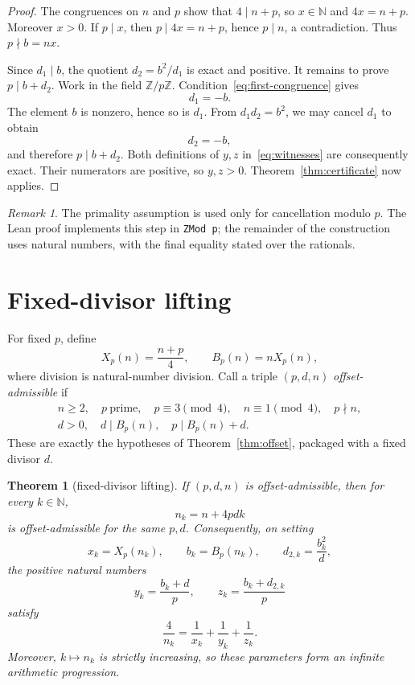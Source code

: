 \documentclass[11pt]{article}
\newtheorem{theorem}{Theorem}[section]
\theoremstyle{remark}
\newtheorem*{remark}{Remark}
\newcommand{\N}{\mathbb{N}}
\newcommand{\Z}{\mathbb{Z}}
\begin{document}
\begin{proof}
The congruences on \(n\) and \(p\) show that \(4\mid n+p\), so \(x\in\N\) and
\(4x=n+p\).  Moreover \(x>0\).  If \(p\mid x\), then
\(p\mid4x=n+p\), hence \(p\mid n\), a contradiction.  Thus \(p\nmid b=nx\).

Since \(d_1\mid b\), the quotient \(d_2=b^2/d_1\) is exact and positive.  It
remains to prove \(p\mid b+d_2\).  Work in the field \(\Z/p\Z\).
Condition~\eqref{eq:first-congruence} gives
\[
  d_1=-b.
\]
The element \(b\) is nonzero, hence so is \(d_1\).  From \(d_1d_2=b^2\), we may
cancel \(d_1\) to obtain
\[
  d_2=-b,
\]
and therefore \(p\mid b+d_2\).  Both definitions of \(y,z\)
in~\eqref{eq:witnesses} are consequently exact.  Their numerators are positive,
so \(y,z>0\).  Theorem~\ref{thm:certificate} now applies.
\end{proof}

\begin{remark}
The primality assumption is used only for cancellation modulo \(p\).  The Lean
proof implements this step in \texttt{ZMod p}; the remainder of the construction
uses natural numbers, with the final equality stated over the rationals.
\end{remark}

\section{Fixed-divisor lifting}

For fixed \(p\), define
\[
  X_p(n)=\frac{n+p}{4},
  \qquad
  B_p(n)=nX_p(n),
\]
where division is natural-number division.  Call a triple \((p,d,n)\)
\emph{offset-admissible} if
\[
\begin{gathered}
  n\ge2,\quad p\ \text{prime},\quad
  p\equiv3\pmod4,\quad n\equiv1\pmod4,\quad p\nmid n,\\
  d>0,\quad d\mid B_p(n),\quad p\mid B_p(n)+d.
\end{gathered}
\]
These are exactly the hypotheses of Theorem~\ref{thm:offset}, packaged with a
fixed divisor \(d\).

\begin{theorem}[fixed-divisor lifting]\label{thm:lifting}
If \((p,d,n)\) is offset-admissible, then for every \(k\in\N\),
\[
  n_k=n+4pdk
\]
is offset-admissible for the same \(p,d\).  Consequently, on setting
\[
  x_k=X_p(n_k),\qquad b_k=B_p(n_k),\qquad
  d_{2,k}=\frac{b_k^2}{d},
\]
the positive natural numbers
\[
  y_k=\frac{b_k+d}{p},
  \qquad
  z_k=\frac{b_k+d_{2,k}}{p}
\]
satisfy
\[
  \frac4{n_k}=\frac1{x_k}+\frac1{y_k}+\frac1{z_k}.
\]
Moreover, \(k\mapsto n_k\) is strictly increasing, so these parameters form an
infinite arithmetic progression.
\end{theorem}
\end{document}
